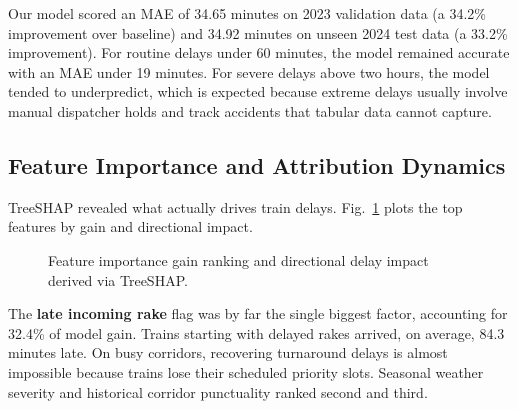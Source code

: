 \documentclass[11pt,a4paper]{article}
\begin{document}
Our model scored an MAE of 34.65 minutes on 2023 validation data (a 34.2\% improvement over baseline) and 34.92 minutes on unseen 2024 test data (a 33.2\% improvement). For routine delays under 60 minutes, the model remained accurate with an MAE under 19 minutes. For severe delays above two hours, the model tended to underpredict, which is expected because extreme delays usually involve manual dispatcher holds and track accidents that tabular data cannot capture.

\subsection{Feature Importance and Attribution Dynamics}
TreeSHAP revealed what actually drives train delays. Fig.~\ref{fig:shap_bars} plots the top features by gain and directional impact.

\begin{figure}[!ht]
\centering
{}
\caption{Feature importance gain ranking and directional delay impact derived via TreeSHAP.}
\label{fig:shap_bars}
\end{figure}

The \textbf{late incoming rake} flag was by far the single biggest factor, accounting for 32.4\% of model gain. Trains starting with delayed rakes arrived, on average, 84.3 minutes late. On busy corridors, recovering turnaround delays is almost impossible because trains lose their scheduled priority slots. Seasonal weather severity and historical corridor punctuality ranked second and third.
\end{document}
